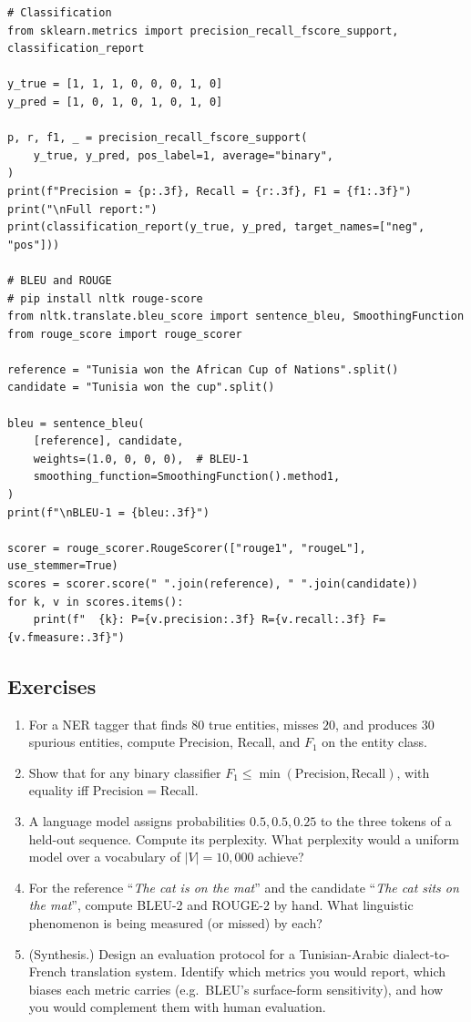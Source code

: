 \documentclass[12pt,a4paper]{report}
\theoremstyle{definition}
\theoremstyle{remark}
\begin{document}
\begin{lstlisting}
# Classification
from sklearn.metrics import precision_recall_fscore_support, classification_report

y_true = [1, 1, 1, 0, 0, 0, 1, 0]
y_pred = [1, 0, 1, 0, 1, 0, 1, 0]

p, r, f1, _ = precision_recall_fscore_support(
    y_true, y_pred, pos_label=1, average="binary",
)
print(f"Precision = {p:.3f}, Recall = {r:.3f}, F1 = {f1:.3f}")
print("\nFull report:")
print(classification_report(y_true, y_pred, target_names=["neg", "pos"]))

# BLEU and ROUGE
# pip install nltk rouge-score
from nltk.translate.bleu_score import sentence_bleu, SmoothingFunction
from rouge_score import rouge_scorer

reference = "Tunisia won the African Cup of Nations".split()
candidate = "Tunisia won the cup".split()

bleu = sentence_bleu(
    [reference], candidate,
    weights=(1.0, 0, 0, 0),  # BLEU-1
    smoothing_function=SmoothingFunction().method1,
)
print(f"\nBLEU-1 = {bleu:.3f}")

scorer = rouge_scorer.RougeScorer(["rouge1", "rougeL"], use_stemmer=True)
scores = scorer.score(" ".join(reference), " ".join(candidate))
for k, v in scores.items():
    print(f"  {k}: P={v.precision:.3f} R={v.recall:.3f} F={v.fmeasure:.3f}")
\end{lstlisting}

\subsection{Exercises}
\begin{enumerate}
    \item For a NER tagger that finds $80$ true entities, misses $20$, and produces $30$ spurious entities, compute Precision, Recall, and $F_1$ on the entity class.
    \item Show that for any binary classifier $F_1 \le \min(\mathrm{Precision}, \mathrm{Recall})$, with equality iff $\mathrm{Precision} = \mathrm{Recall}$.
    \item A language model assigns probabilities $0.5, 0.5, 0.25$ to the three tokens of a held-out sequence. Compute its perplexity. What perplexity would a uniform model over a vocabulary of $|V| = 10{,}000$ achieve?
    \item For the reference ``\emph{The cat is on the mat}'' and the candidate ``\emph{The cat sits on the mat}'', compute BLEU-2 and ROUGE-2 by hand. What linguistic phenomenon is being measured (or missed) by each?
    \item (Synthesis.) Design an evaluation protocol for a Tunisian-Arabic dialect-to-French translation system. Identify which metrics you would report, which biases each metric carries (e.g.\ BLEU's surface-form sensitivity), and how you would complement them with human evaluation.
\end{enumerate}
\end{document}
